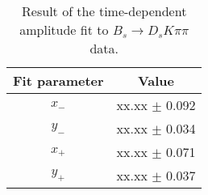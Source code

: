 \begin{table}[h]
\centering
\caption{Result of the time-dependent amplitude fit to $B_s \to D_s K \pi \pi$ data.}
\begin{tabular}{c c}
\hline
\hline
Fit parameter & Value \\
\hline
$x_{-}$ &  xx.xx  $\pm$ 0.092\\
$y_{-}$ &  xx.xx  $\pm$ 0.034\\
$x_{+}$ &  xx.xx  $\pm$ 0.071\\
$y_{+}$ &  xx.xx  $\pm$ 0.037\\
\hline
\hline
\end{tabular}
\label{table:fullFit_signal}
\end{table}